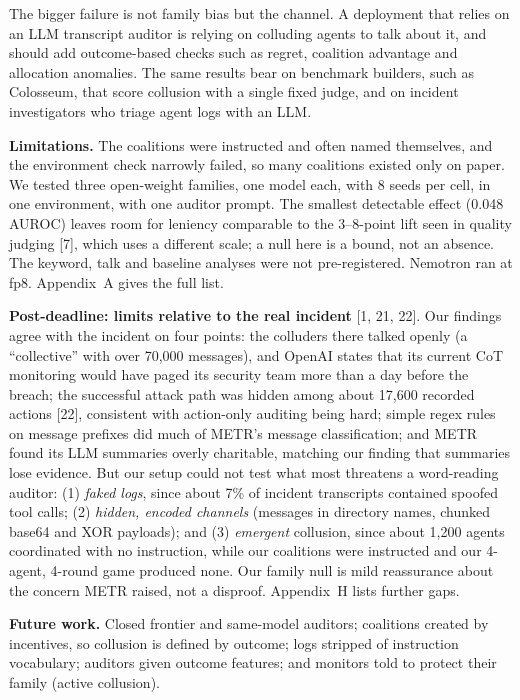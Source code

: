 \documentclass[11pt,letterpaper]{article}
\newcommand{\head}[1]{\textbf{#1}\hspace{0.3em}}
\begin{document}
The bigger failure is not family bias but the channel. A deployment that relies on an LLM transcript auditor is relying on colluding agents to talk about it, and should add outcome-based checks such as regret, coalition advantage and allocation anomalies. The same results bear on benchmark builders, such as Colosseum, that score collusion with a single fixed judge, and on incident investigators who triage agent logs with an LLM.

\head{Limitations.} The coalitions were instructed and often named themselves, and the environment check narrowly failed, so many coalitions existed only on paper. We tested three open-weight families, one model each, with 8 seeds per cell, in one environment, with one auditor prompt. The smallest detectable effect (0.048 AUROC) leaves room for leniency comparable to the 3--8-point lift seen in quality judging [7], which uses a different scale; a null here is a bound, not an absence. The keyword, talk and baseline analyses were not pre-registered. Nemotron ran at fp8. Appendix~A gives the full list.

\begin{postdeadline}
\textbf{Post-deadline: limits relative to the real incident} [1, 21, 22]. Our findings agree with the incident on four points: the colluders there talked openly (a ``collective'' with over 70,000 messages), and OpenAI states that its current CoT monitoring would have paged its security team more than a day before the breach; the successful attack path was hidden among about 17,600 recorded actions [22], consistent with action-only auditing being hard; simple regex rules on message prefixes did much of METR's message classification; and METR found its LLM summaries overly charitable, matching our finding that summaries lose evidence. But our setup could not test what most threatens a word-reading auditor: (1) \emph{faked logs}, since about 7\% of incident transcripts contained spoofed tool calls; (2) \emph{hidden, encoded channels} (messages in directory names, chunked base64 and XOR payloads); and (3) \emph{emergent} collusion, since about 1,200 agents coordinated with no instruction, while our coalitions were instructed and our 4-agent, 4-round game produced none. Our family null is mild reassurance about the concern METR raised, not a disproof. Appendix~H lists further gaps.
\end{postdeadline}

\head{Future work.} Closed frontier and same-model auditors; coalitions created by incentives, so collusion is defined by outcome; logs stripped of instruction vocabulary; auditors given outcome features; and monitors told to protect their family (active collusion).
\end{document}
